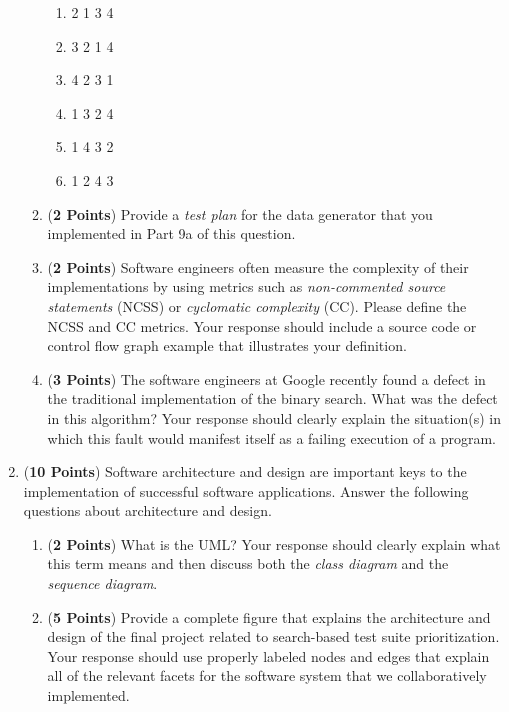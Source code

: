 \documentclass[12pt,epsf,psfig,graphics]{article}
\begin{document}
\begin{enumerate}
\begin{enumerate}
\begin{enumerate}
    \item 2 1 3 4
      
    \item 3 2 1 4

    \item 4 2 3 1

    \item 1 3 2 4
        
    \item 1 4 3 2

    \item 1 2 4 3

  \end{enumerate}

  \item ({\bf 2 Points}) Provide a {\em test plan} for the data
    generator that you implemented in Part 9a of this question.

  \item ({\bf 2 Points}) Software engineers often measure the
    complexity of their implementations by using metrics such as {\em
      non-commented source statements} (NCSS) or {\em cyclomatic
      complexity} (CC).  Please define the NCSS and CC metrics.  Your
    response should include a source code or control flow graph
    example that illustrates your definition.

  \item ({\bf 3 Points}) The software engineers at Google recently
    found a defect in the traditional implementation of the binary
    search.  What was the defect in this algorithm?  Your response
    should clearly explain the situation(s) in which this fault would
    manifest itself as a failing execution of a program.

\end{enumerate}

\newpage

\item ({\bf 10 Points}) Software architecture and design are important
  keys to the implementation of successful software applications.
  Answer the following questions about architecture and design.

  \begin{enumerate}

    \item ({\bf 2 Points}) What is the UML?  Your response should
      clearly explain what this term means and then discuss both the
      {\em class diagram} and the {\em sequence diagram}.

    \item ({\bf 5 Points}) Provide a complete figure that explains the
      architecture and design of the final project related to
      search-based test suite prioritization.  Your response should
      use properly labeled nodes and edges that explain all of the
      relevant facets for the software system that we collaboratively
      implemented.


\end{enumerate}
\end{enumerate}
\end{document}
